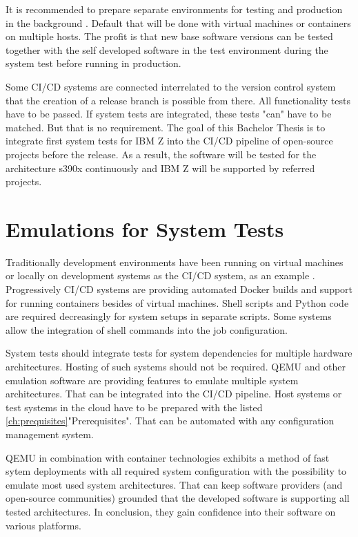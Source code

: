 It is recommended to prepare separate environments for testing and production in the background \cite[~p.120]{Scholl2019}. 
Default that will be done with virtual machines or containers on multiple hosts. The profit is that new base software versions can be tested together with the self developed software in the test environment during the system test before running in production.

Some CI/CD systems are connected interrelated to the version control system that the creation of a release branch is possible from there. All functionality tests have to be passed.  If system tests are integrated, these tests "can" have to be matched. But that is no requirement. The goal of this Bachelor Thesis is to integrate first system tests for IBM Z into the CI/CD pipeline of open-source projects before the release. As a result, the software will be tested for the architecture s390x continuously and IBM Z will be supported by referred projects.

\section{Emulations for System Tests}

Traditionally development environments have been running on virtual machines or locally on development systems as the CI/CD system, as an example \cite[~p.123]{Scholl2019}. Progressively CI/CD systems are providing automated Docker builds and support for running containers besides of virtual machines. 
Shell scripts and Python code are required decreasingly for system setups in separate scripts. Some systems allow the integration of shell commands into the job configuration.

System tests should integrate tests for system dependencies for multiple hardware architectures. Hosting of such systems should not be required. QEMU and other emulation software are providing features to emulate multiple system architectures.
That can be integrated into the CI/CD pipeline. Host systems or test systems in the cloud have to be prepared with the listed \ref{ch:prequisites}"Prerequisites". That can be automated with any configuration management system.

QEMU in combination with container technologies exhibits a method of fast sytem deployments with all required system configuration with the possibility to emulate most used system architectures. That can keep software providers (and open-source communities) grounded that the developed software is supporting all tested architectures. 
In conclusion, they gain confidence into their software on various platforms.